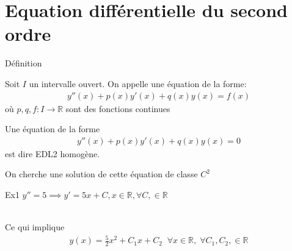 
    \section{Equation différentielle du second ordre}
   
    \begin{parag}{Définition}
        \begin{definition}
            Soit $I$ un intervalle ouvert. On appelle  une équation de la forme:
            \begin{align*}
                y''(x) + p(x)y'(x) + q(x)y(x) = f(x) 
            \end{align*}
            où $p, q, f: I \to \mathbb{R}$ sont des fonctions continues
            
        \end{definition}
       
        \begin{definition}
            Une équation de la forme
            \begin{align*}
                y''(x) + p(x)y'(x) + q(x)y(x) = 0
            \end{align*}
            est dire EDL2 homogène.
 
        \end{definition}
        
        On cherche une solution de cette équation de classe $C^2$
        \begin{subparag}{Ex1}
            $y'' = 5 \implies y' = 5x + C, x \in \mathbb{R}, \forall C, \in \mathbb{R} $

           \\
           Ce qui implique
           \begin{align*}
               y(x) = \frac{5}{2}x^2 + C_1x + C_2 \; \; \forall x \in \mathbb{R}, \; \forall C_1, C_2, \in \mathbb{R}
           \end{align*}
           
        \end{subparag}
    
    \end{parag}


